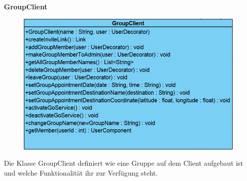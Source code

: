 \textbf{GroupClient}
\begin{figure}[H]
	\includegraphics[scale = .5]{res/umlClasses/GroupClient.png}
	\centering
\end{figure}
Die Klasse GroupClient definiert wie eine Gruppe auf dem Client aufgebaut ist und welche Funktionalität ihr zur Verfügung steht.
